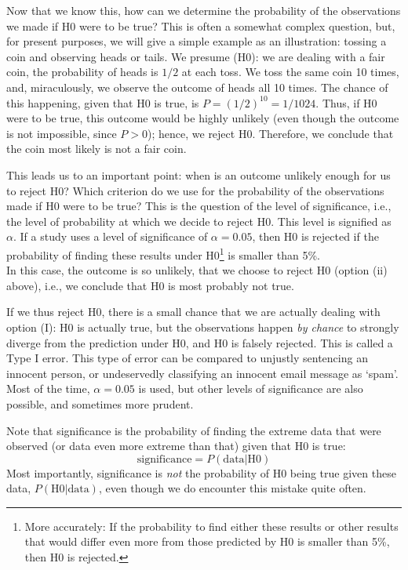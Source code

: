 \documentclass[
]{book}
\begin{document}
Now that we know this, how can we determine the probability of the observations we made if H0 were to be true? This is often a somewhat complex question, but, for present purposes, we will give a simple example as an illustration: tossing a coin and observing heads or tails. We presume (H0): we are dealing with a fair coin, the probability of heads is \(1/2\) at each toss. We toss the same coin 10 times, and, miraculously, we observe the outcome of heads all 10 times. The chance of this happening, given that H0 is true, is \(P = (1/2)^{10} = 1/1024\). Thus, if H0 were to be true, this outcome would be highly unlikely (even though the outcome is not impossible, since \(P > 0\)); hence, we reject H0. Therefore, we conclude that the coin most likely is not a fair coin.

This leads us to an important point: when is an outcome unlikely enough for us to reject H0? Which criterion do we use for the probability of the observations made if H0 were to be true? This is the question of the level of significance, i.e., the level of probability at which we decide to reject H0. This level is signified as \(\alpha\). If a study uses a level of significance of \(\alpha = 0.05\), then H0 is rejected if the probability of finding these results under H0\footnote{More accurately: If the probability to find either these results or other results that would differ even more from those predicted by H0 is smaller than 5\%, then H0 is rejected.} is smaller than 5\%.\\
In this case, the outcome is so unlikely, that we choose to reject H0 (option (ii) above), i.e., we conclude that H0 is most probably not true.

If we thus reject H0, there is a small chance that we are actually dealing with option (I): H0 is actually true, but the observations happen \emph{by chance} to strongly diverge from the prediction under H0, and H0 is falsely rejected. This is called a Type I error. This type of error can be compared to unjustly sentencing an innocent person, or undeservedly classifying an innocent email message as `spam'. Most of the time, \(\alpha = 0.05\) is used, but other levels of significance are also possible, and sometimes more prudent.

Note that significance is the probability of finding the extreme data that were observed (or data even more extreme than that) given that H0 is true:
\[\textrm{significance} = P(\textrm{data}|\textrm{H0})\]
Most importantly, significance is \emph{not} the probability of H0 being true given these data, \(P(\textrm{H0}|\textrm{data})\), even though we do encounter this mistake quite often.
\end{document}
